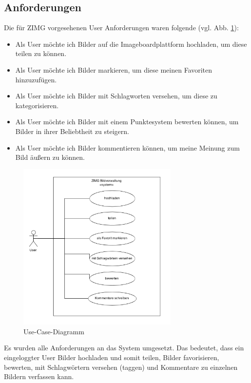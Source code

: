 \documentclass[12pt, oneside, a4paper]{article}		%
\begin{document}
\subsection{Anforderungen}

Die für ZIMG vorgesehenen User Anforderungen waren folgende (vgl. Abb. \ref{ZIMGUseCaseDiagram}):

\begin{itemize}
	\item Als User möchte ich Bilder auf die Imageboardplattform hochladen, um diese teilen zu können.
	\item Als User möchte ich Bilder markieren, um diese meinen Favoriten hinzuzufügen.
	\item Als User möchte ich Bilder mit Schlagworten versehen, um diese zu kategorisieren.
	\item Als User möchte ich Bilder mit einem Punktesystem bewerten können, um Bilder in ihrer Beliebtheit zu steigern.
	\item Als User möchte ich Bilder kommentieren können, um meine Meinung zum Bild äußern zu können.
\end{itemize}

\begin{figure}[H]
 	\centering
 	\includegraphics[width=8cm]{footage/ZIMG_UseCaseDiagram} 
 	\caption{Use-Case-Diagramm}
	\label{ZIMGUseCaseDiagram}
 \end{figure}

 Es wurden alle Anforderungen an das System umgesetzt. Das bedeutet, dass ein eingeloggter User Bilder hochladen und somit teilen, Bilder favorisieren, bewerten, mit Schlagwörtern versehen (taggen) und Kommentare zu einzelnen Bildern verfassen kann.
\end{document}
